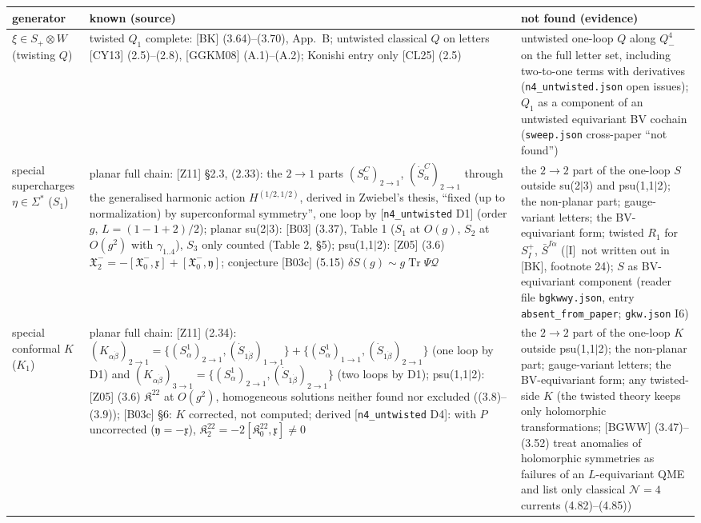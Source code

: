 \documentclass[11pt]{article}
\theoremstyle{definition}
\newcommand{\Tr}{\operatorname{Tr}}
\newcommand{\Il}{\textup{[I]}}
\begin{document}
\begin{longtable}{p{2.6cm}p{6.6cm}p{6.6cm}}
\toprule
generator & known (source) & not found (evidence)\\
\midrule
$\xi\in S_+\otimes W$ (twisting $Q$) & twisted $Q_1$ complete: [BK] (3.64)--(3.70), App.~B; untwisted classical $Q$ on letters [CY13] (2.5)--(2.8), [GGKM08] (A.1)--(A.2); Konishi entry only [CL25] (2.5) & untwisted one-loop $Q$ along $Q^4_-$ on the full letter set, including two-to-one terms with derivatives (\texttt{n4\_untwisted.json} open issues); $Q_1$ as a component of an untwisted equivariant BV cochain (\texttt{sweep.json} cross-paper ``not found'')\\
special supercharges $\eta\in\Sigma^*$ ($S_1$) & planar full chain: [Z11] \S2.3, (2.33): the $2\to1$ parts $(S^C_\alpha)_{2\to1}$, $(\dot S^C_{\dot\alpha})_{2\to1}$ through the generalised harmonic action $H^{(1/2,1/2)}$, derived in Zwiebel's thesis, ``fixed (up to normalization) by superconformal symmetry'', one loop by [\texttt{n4\_untwisted} D1] (order $g$, $L=(1-1+2)/2$); planar su(2$|$3): [B03] (3.37), Table 1 ($S_1$ at $O(g)$, $S_2$ at $O(g^2)$ with $\gamma_{1..4}$), $S_3$ only counted (Table 2, \S5); psu(1,1$|$2): [Z05] (3.6) $\mathfrak X^-_2=-[\mathfrak X^-_0,\mathfrak x]+[\mathfrak X^-_0,\mathfrak y]$; conjecture [B03c] (5.15) $\delta S(g)\sim g\Tr\Psi\mathcal Q$ & the $2\to2$ part of the one-loop $S$ outside su(2$|$3) and psu(1,1$|$2); the non-planar part; gauge-variant letters; the BV-equivariant form; twisted $R_1$ for $S^+_I$, $\bar S^{I\dot\alpha}$ (\Il\ not written out in [BK], footnote 24); $S$ as BV-equivariant component (reader file \texttt{bgkwwy.json}, entry \texttt{absent\_from\_paper}; \texttt{gkw.json} I6)\\
special conformal $K$ ($K_1$) & planar full chain: [Z11] (2.34): $(K_{\alpha\dot\beta})_{2\to1}=\{(S^1_\alpha)_{2\to1},(\dot S_{1\dot\beta})_{1\to1}\}+\{(S^1_\alpha)_{1\to1},(\dot S_{1\dot\beta})_{2\to1}\}$ (one loop by D1) and $(K_{\alpha\dot\beta})_{3\to1}=\{(S^1_\alpha)_{2\to1},(\dot S_{1\dot\beta})_{2\to1}\}$ (two loops by D1); psu(1,1$|$2): [Z05] (3.6) $\mathfrak K^{22}$ at $O(g^2)$, homogeneous solutions neither found nor excluded ((3.8)--(3.9)); [B03c] \S6: $K$ corrected, not computed; derived [\texttt{n4\_untwisted} D4]: with $P$ uncorrected ($\mathfrak y=-\mathfrak x$), $\mathfrak K^{22}_2=-2[\mathfrak K^{22}_0,\mathfrak x]\neq0$ & the $2\to2$ part of the one-loop $K$ outside psu(1,1$|$2); the non-planar part; gauge-variant letters; the BV-equivariant form; any twisted-side $K$ (the twisted theory keeps only holomorphic transformations; [BGWW] (3.47)--(3.52) treat anomalies of holomorphic symmetries as failures of an $L$-equivariant QME and list only classical $\mathcal N=4$ currents (4.82)--(4.85))\\

\end{longtable}
\end{document}
